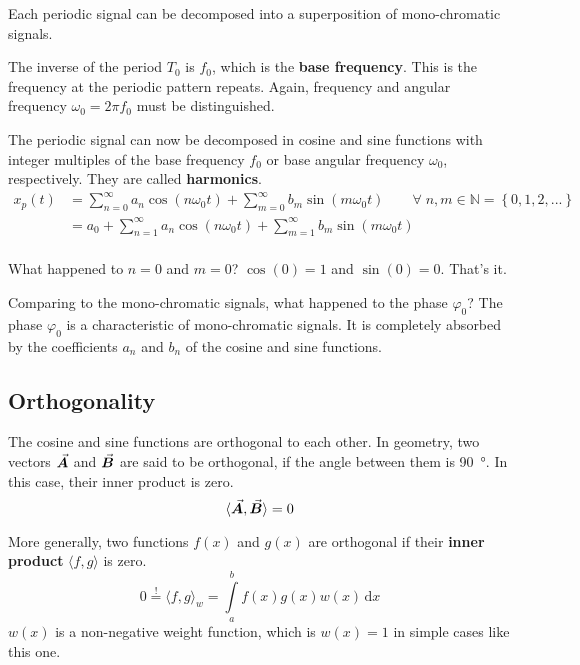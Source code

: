 \begin{refsection}
\begin{fact}
	Each periodic signal can be decomposed into a superposition of mono-chromatic signals.
\end{fact}

The inverse of the period $T_0$ is $f_0$, which is the \textbf{base frequency}. This is the frequency at the periodic pattern repeats. Again, frequency and angular frequency $\omega_0 = 2 \pi f_0$ must be distinguished.

The periodic signal can now be decomposed in cosine and sine functions with integer multiples of the base frequency $f_0$ or base angular frequency $\omega_0$, respectively. They are called  \textbf{harmonics}.
\begin{equation}
	\begin{split}
		x_p(t) &= \sum\limits_{n=0}^{\infty} a_n \cos\left(n \omega_0 t\right) + \sum\limits_{m=0}^{\infty} b_m \sin\left(m \omega_0 t\right) \qquad \forall \; n, m \in \mathbb{N} = \left\{0, 1, 2, ...\right\} \\
		 &= a_0 + \sum\limits_{n=1}^{\infty} a_n \cos\left(n \omega_0 t\right) + \sum\limits_{m=1}^{\infty} b_m \sin\left(m \omega_0 t\right) \\
	\end{split}
	\label{eq:ch02:fourier_series}
\end{equation}

What happened to $n = 0$ and $m = 0$? $\cos(0) = 1$ and $\sin(0) = 0$. That's it.

Comparing to the mono-chromatic signals, what happened to the phase $\varphi_0$? The phase $\varphi_0$ is a characteristic of mono-chromatic signals. It is completely absorbed by the coefficients $a_n$ and $b_n$ of the cosine and sine functions.

\subsection{Orthogonality}
The cosine and sine functions are orthogonal to each other. In geometry, two vectors $\vec{\bm{A}}$ and $\vec{\bm{B}}$ are said to be orthogonal, if the angle between them is \SI{90}{\degree}. In this case, their inner product is zero.
\begin{equation}
	\langle \vec{\bm{A}}, \vec{\bm{B}} \rangle = 0
\end{equation}

More generally, two functions $f(x)$ and $g(x)$ are orthogonal if their  \textbf{inner product} $\langle f, g \rangle$ is zero. 
\begin{equation}
	0 \stackrel{!}{=} \langle f, g \rangle_w = \int\limits_{a}^{b} f(x) g(x) w(x) \, \mathrm{d} x
\end{equation}
$w(x)$ is a non-negative weight function, which is $w(x) = 1$ in simple cases like this one.


\end{refsection}
